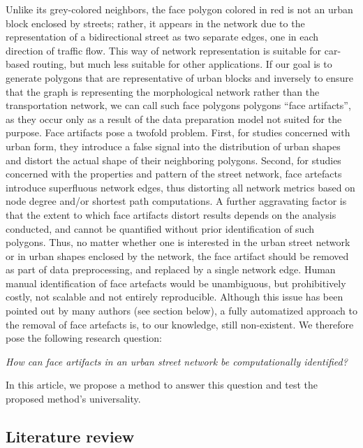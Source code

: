 Unlike its grey-colored neighbors, the face polygon colored in red is not an urban block
enclosed by streets; rather, it appears in the network due to the representation of a
bidirectional street as two separate edges, one in each direction of traffic flow. This
way of network representation is suitable for car-based routing, but much less suitable
for other applications. If our goal is to generate polygons that are representative of
urban blocks and inversely to ensure that the graph is representing the morphological
network rather than the transportation network, we can call such face polygons polygons
``face artifacts'', as they occur only as a result of the data preparation model not
suited for the purpose. Face artifacts pose a twofold problem. First, for studies
concerned with urban form, they introduce a false signal into the distribution of urban
shapes and distort the actual shape of their neighboring polygons. Second, for studies
concerned with the properties and pattern of the street network, face artefacts
introduce superfluous network edges, thus distorting all network metrics based on node
degree and/or shortest path computations. A further aggravating factor is that the
extent to which face artifacts distort results depends on the analysis conducted, and
cannot be quantified without prior identification of such polygons. Thus, no matter
whether one is interested in the urban street network or in urban shapes enclosed by the
network, the face artifact should be removed as part of data preprocessing, and replaced
by a single network edge. Human manual identification of face artefacts would be
unambiguous, but prohibitively costly, not scalable and not entirely reproducible.
Although this issue has been pointed out by many authors (see section below), a fully
automatized approach to the removal of face artefacts is, to our knowledge, still
non-existent. We therefore pose the following research question:

\begin{center}
\textit{How can face artifacts in an urban street network be computationally identified?}
\end{center}

In this article, we propose a method to answer this question and test the proposed
method’s universality.

\subsection*{Literature review}


